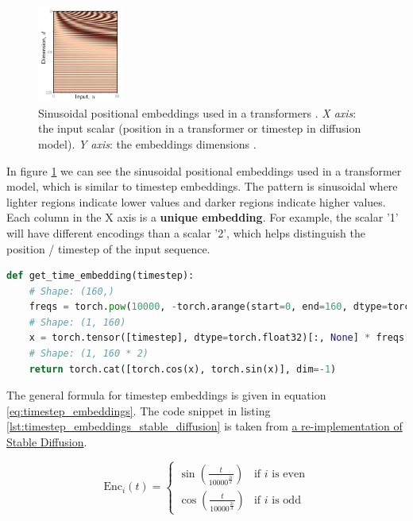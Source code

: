 \begin{figure}[h]
    \centering
    \includegraphics[width=0.25\textwidth]{images/diffusion_models/stable_diffusion/positional_encodings.png}
    \caption{Sinusoidal positional embeddings used in a transformers \cite{understanding_deep_learning_book_2024}. \textit{X axis}: the input scalar (position in a transformer or timestep in diffusion model). \textit{Y axis}: the embeddings dimensions \cite{understanding_deep_learning_book_2024}.}
    \label{fig:sinusoidal_embeddings}
\end{figure}

In figure \ref{fig:sinusoidal_embeddings} we can see the sinusoidal positional embeddings used in a transformer model, which is similar to timestep embeddings. The pattern is sinusoidal where lighter regions indicate lower values and darker regions indicate higher values. Each column in the X axis is a \textbf{unique embedding}. For example, the scalar '1' will have different encodings than a scalar '2', which helps distinguish the position / timestep of the input sequence.

\begin{lstlisting}[language=Python, breaklines=true, caption={Timestep embeddings in Stable Diffusion: we convert the timestep to an embedding.}, label={lst:timestep_embeddings_stable_diffusion}]
def get_time_embedding(timestep):
    # Shape: (160,)
    freqs = torch.pow(10000, -torch.arange(start=0, end=160, dtype=torch.float32) / 160) 
    # Shape: (1, 160)
    x = torch.tensor([timestep], dtype=torch.float32)[:, None] * freqs[None]
    # Shape: (1, 160 * 2)
    return torch.cat([torch.cos(x), torch.sin(x)], dim=-1)
\end{lstlisting}

The general formula for timestep embeddings is given in equation \ref{eq:timestep_embeddings}. The code snippet in listing \ref{lst:timestep_embeddings_stable_diffusion} is taken from \href{https://github.com/hkproj/pytorch-stable-diffusion/blob/e0cb06de011787cdf13eed7b4287ad8410491149/sd/pipeline.py#L164}{a re-implementation of Stable Diffusion}.

\begin{equation}
    \text{Enc}_i(t) =
    \begin{cases}
        \sin\left(\frac{t}{10000^{\frac{2i}{d}}}\right) & \text{if } i \text{ is even} \\
        \cos\left(\frac{t}{10000^{\frac{2i}{d}}}\right) & \text{if } i \text{ is odd}
    \end{cases}
    \label{eq:timestep_embeddings}
\end{equation}










